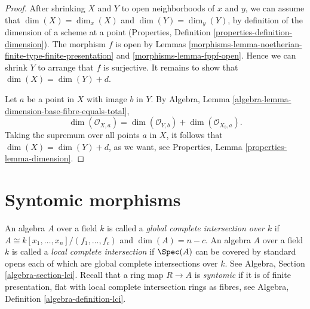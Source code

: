 \begin{proof}

After shrinking $X$ and $Y$ to open neighborhoods of $x$ and $y$,
we can assume that $\dim(X) = \dim_x(X)$ and $\dim(Y) = \dim_y(Y)$,
by definition of the dimension of a scheme at a point
(Properties, Definition \ref{properties-definition-dimension}).
The morphism $f$ is open by Lemmas
\ref{morphisms-lemma-noetherian-finite-type-finite-presentation} and
\ref{morphisms-lemma-fppf-open}.
Hence we can shrink $Y$ to arrange that $f$ is surjective.
It remains to show that $\dim(X) = \dim(Y) + d$.

\medskip\noindent
Let $a$ be a point in $X$ with image $b$ in $Y$. By
Algebra, Lemma \ref{algebra-lemma-dimension-base-fibre-equals-total},
$$
\dim(\mathcal{O}_{X,a}) = \dim(\mathcal{O}_{Y,b}) + \dim(\mathcal{O}_{X_b, a}).
$$
Taking the supremum over all points $a$ in $X$, it follows
that $\dim(X) = \dim(Y) + d$, as we want, see
Properties, Lemma \ref{properties-lemma-dimension}.
\end{proof}

\section{Syntomic morphisms}
\label{morphisms-section-syntomic}
An algebra $A$ over a field $k$ is called a
{\it global complete intersection over $k$}
if $A \cong k[x_1, \ldots, x_n]/(f_1, \ldots, f_c)$ and
$\dim(A) = n - c$. An algebra $A$ over a field $k$ is called a
{\it local complete intersection} if $\Spec(A)$
can be covered by standard opens each of which are global
complete intersections over $k$. See Algebra, Section
\ref{algebra-section-lci}. Recall that a ring map $R \to A$
is {\it syntomic} if it is of finite presentation,
flat with local complete intersection rings as fibres,
see Algebra, Definition \ref{algebra-definition-lci}.

